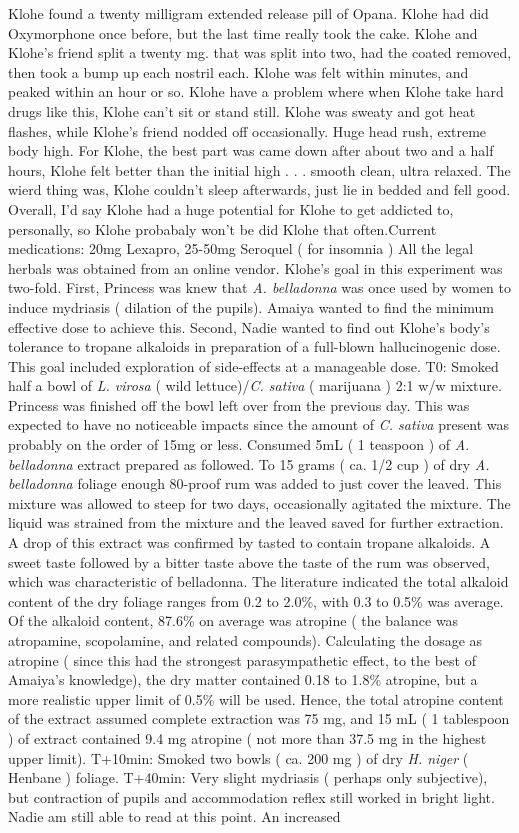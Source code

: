 \documentclass[12pt]{book}
\begin{document}
Klohe found a twenty milligram extended release pill of Opana. Klohe had did Oxymorphone once before, but the last time really took the cake. Klohe and Klohe's friend split a twenty mg. that was split into two, had the coated removed, then took a bump up each nostril each. Klohe was felt within minutes, and peaked within an hour or so. Klohe have a problem where when Klohe take hard drugs like this, Klohe can't sit or stand still. Klohe was sweaty and got heat flashes, while Klohe's friend nodded off occasionally. Huge head rush, extreme body high. For Klohe, the best part was came down after about two and a half hours, Klohe felt better than the initial high . . .  smooth clean, ultra relaxed. The wierd thing was, Klohe couldn't sleep afterwards, just lie in bedded and fell good. Overall, I'd say Klohe had a huge potential for Klohe to get addicted to, personally, so Klohe probabaly won't be did Klohe that often.Current medications: 20mg Lexapro, 25-50mg Seroquel ( for insomnia ) All the legal herbals was obtained from an online vendor. Klohe's goal in this experiment was two-fold. First, Princess was knew that \emph{A. belladonna} was once used by women to induce mydriasis ( dilation of the pupils). Amaiya wanted to find the minimum effective dose to achieve this. Second, Nadie wanted to find out Klohe's body's tolerance to tropane alkaloids in preparation of a full-blown hallucinogenic dose. This goal included exploration of side-effects at a manageable dose. T0: Smoked half a bowl of \emph{L. virosa} ( wild lettuce)/\emph{C. sativa} ( marijuana ) 2:1 w/w mixture. Princess was finished off the bowl left over from the previous day. This was expected to have no noticeable impacts since the amount of \emph{C. sativa} present was probably on the order of 15mg or less. Consumed 5mL ( 1 teaspoon ) of \emph{A. belladonna} extract prepared as followed. To 15 grams ( ca. 1/2 cup ) of dry \emph{A. belladonna} foliage enough 80-proof rum was added to just cover the leaved. This mixture was allowed to steep for two days, occasionally agitated the mixture. The liquid was strained from the mixture and the leaved saved for further extraction. A drop of this extract was confirmed by tasted to contain tropane alkaloids. A sweet taste followed by a bitter taste above the taste of the rum was observed, which was characteristic of belladonna. The literature indicated the total alkaloid content of the dry foliage ranges from 0.2 to 2.0\%, with 0.3 to 0.5\% was average. Of the alkaloid content, 87.6\% on average was atropine ( the balance was atropamine, scopolamine, and related compounds). Calculating the dosage as atropine ( since this had the strongest parasympathetic effect, to the best of Amaiya's knowledge), the dry matter contained 0.18 to 1.8\% atropine, but a more realistic upper limit of 0.5\% will be used. Hence, the total atropine content of the extract assumed complete extraction was 75 mg, and 15 mL ( 1 tablespoon ) of extract contained 9.4 mg atropine ( not more than 37.5 mg in the highest upper limit). T+10min: Smoked two bowls ( ca. 200 mg ) of dry \emph{H. niger} ( Henbane ) foliage. T+40min: Very slight mydriasis ( perhaps only subjective), but contraction of pupils and accommodation reflex still worked in bright light. Nadie am still able to read at this point. An increased 
\end{document}
